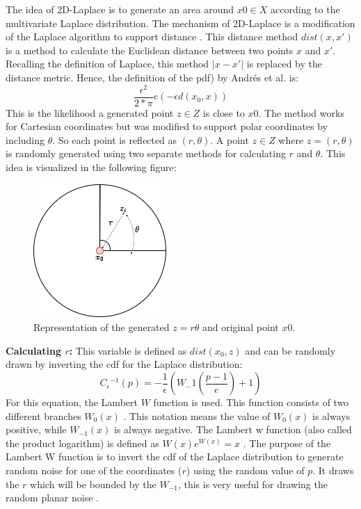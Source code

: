 The idea of 2D-Laplace is to generate an area around $x0 \in X$ according to the multivariate Laplace distribution.
The mechanism of 2D-Laplace is a modification of the Laplace algorithm to support distance \citep{DBLP:journals/corr/abs-1212-1984}.
This distance method $dist(x, x')$ is a method to calculate the Euclidean distance between two points $x$ and $x'$.
Recalling the definition of Laplace, this method $|x-x'|$ is replaced by the distance metric.
Hence, the definition of the \gls{pdf}) by Andrés et al. is:
\begin{equation}
  \frac{\epsilon^2}{2*\pi}e(-\epsilon d(x_0, x))
  \label{eq:polar-laplace-pdf}
\end{equation}
This is the likelihood a generated point $z \in Z$ is close to $x0$.
The method works for Cartesian coordinates but was modified to support polar coordinates by including $\theta$.
So each point is reflected as $(r, \theta)$.
A point $z \in Z$ where $z = (r, \theta)$ is randomly generated using two separate methods for calculating $r$ and $\theta$.
This idea is visualized in the following figure:
\begin{figure}[H]
  \includegraphics[scale=0.6]{TheorethicalFramework/ND-Laplace/Images/polar-laplace.png}
  \centering
  \caption{Representation of the generated $z = {r \theta}$ and original point $x0$.}
  \label{figure:parea}
\end{figure}

\textbf{Calculating $r$:}
This variable is defined as $dist(x_0, z)$ and can be randomly drawn by inverting the \gls{cdf} for the Laplace distribution:
\begin{equation}
  C{_\epsilon}{^{-1}}(p) = - \frac{1}{\epsilon}(W_-1 (\frac{p - 1}{e}) + 1)
  \label{eq:lambert_w_1}
\end{equation}
For this equation, the Lambert $W$ function is used. This function consists of two different branches $W_0(x)$  \citep{corless_lambertw_1996}.  This notation  means the value of $W_0(x)$ is always positive, while $W_{-1}(x)$ is always negative. The Lambert w function (also called the product logarithm) is defined as $W(x)e^{W(x)} = x$ \citep{lehtonen_lambert_2016}.
The purpose of the Lambert W function is to invert the \gls{cdf} of the Laplace distribution to generate random noise for one of the coordinates ($r$) using the random value of $p$. It draws the $r$ which will be bounded by the $W_{-1}$, this is very useful for drawing the random planar noise \citep{corless_lambertw_1996}. 

